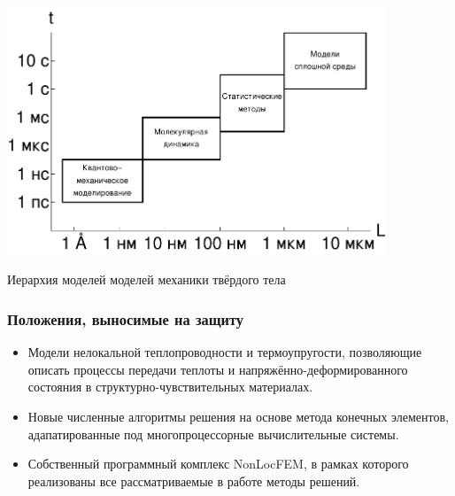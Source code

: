 \begin{frame}

	\begin{center}
	\includegraphics[width=0.85\textwidth]{pics/ModelsHierarchy.pdf}
	
	Иерархия моделей моделей механики твёрдого тела
	\end{center}
\end{frame}

\begin{frame}
    \frametitle{Положения, выносимые на защиту}
    \begin{itemize}
    	\justifying
        \item Модели нелокальной теплопроводности и термоупругости, позволяющие описать процессы передачи теплоты и напряжённо-деформированного состояния в структурно-чувствительных материалах.
        \item Новые численные алгоритмы решения на основе метода конечных элементов, адапатированные под многопроцессорные вычислительные системы.
        \item Собственный программный комплекс NonLocFEM, в рамках которого реализованы все рассматриваемые в работе методы решений.
    \end{itemize}
\end{frame}
